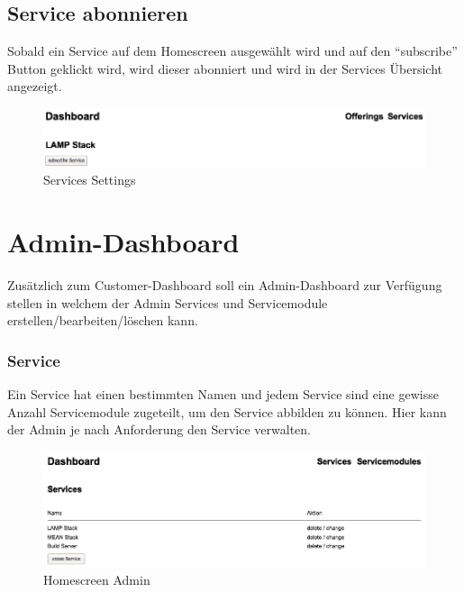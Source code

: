 \subsection{Service abonnieren}
Sobald ein \gls{Service} auf dem Homescreen ausgewählt wird und auf den ``subscribe'' 
Button geklickt wird, wird dieser abonniert und wird in der Services Übersicht 
angezeigt.
\newline

\begin{figure}[!htbp]
\includegraphics[width=\textwidth]{./04_Anforderungen/images/service_settings}
\caption{Services Settings}
\end{figure}

\newpage
\section{Admin-Dashboard}
Zusätzlich zum Customer-Dashboard soll ein Admin-Dashboard zur Verfügung stellen 
in welchem der Admin Services und \gls{Servicemodule} erstellen/bearbeiten/löschen kann.

\subsubsection{Service}
Ein \gls{Service} hat einen bestimmten Namen und jedem Service sind eine gewisse 
Anzahl Servicemodule zugeteilt, um den Service abbilden zu können.
Hier kann der Admin je nach Anforderung den Service verwalten.
\newline
\begin{figure}[!htbp]
\includegraphics[width=\textwidth]{./04_Anforderungen/images/homescreen_admin}
\caption{Homescreen Admin}
\end{figure}

